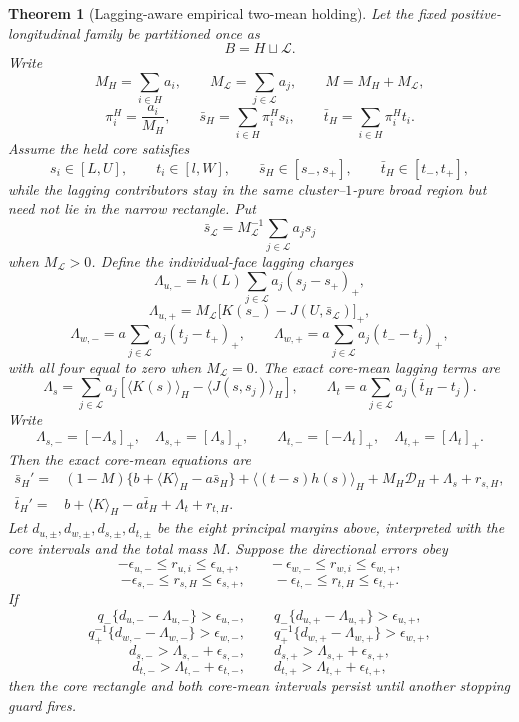\documentclass{article} %
\theoremstyle{plain}
\newtheorem{theorem}{Theorem}[section]
\theoremstyle{definition}
\theoremstyle{remark}
\begin{document}
\begin{theorem}[Lagging-aware empirical two-mean holding]
\label{sbemp:lagging-holding}
Let the fixed positive-longitudinal family be partitioned once as
\[
 B=H\sqcup\mathcal L.
\]
Write
\[
 M_H=\sum_{i\in H}a_i,\qquad
 M_{\mathcal L}=\sum_{j\in\mathcal L}a_j,\qquad M=M_H+M_{\mathcal L},
\]
\[
 \pi_i^H=\frac{a_i}{M_H},\qquad
 \bar s_H=\sum_{i\in H}\pi_i^Hs_i,\qquad
 \bar t_H=\sum_{i\in H}\pi_i^Ht_i.
\]
Assume the held core satisfies
\[
 s_i\in[L,U],\qquad t_i\in[l,W],\qquad
 \bar s_H\in[s_-,s_+],\qquad \bar t_H\in[t_-,t_+],
\]
while the lagging contributors stay in the same cluster--$1$-pure broad
region but need not lie in the narrow rectangle.  Put
\[
 \bar s_{\mathcal L}
 =M_{\mathcal L}^{-1}\sum_{j\in\mathcal L}a_js_j
\]
when $M_{\mathcal L}>0$.  Define the individual-face lagging charges
\[
 \Lambda_{u,-}
 =h(L)\sum_{j\in\mathcal L}a_j(s_j-s_+)_+,
\]
\[
 \Lambda_{u,+}
 =M_{\mathcal L}
 \bigl[K(s_-)-J(U,\bar s_{\mathcal L})\bigr]_+,
\]
\[
 \Lambda_{w,-}
 =a\sum_{j\in\mathcal L}a_j(t_j-t_+)_+,
 \qquad
 \Lambda_{w,+}
 =a\sum_{j\in\mathcal L}a_j(t_--t_j)_+,
\]
with all four equal to zero when $M_{\mathcal L}=0$.  The exact core-mean
lagging terms are
\[
 \Lambda_s
 =\sum_{j\in\mathcal L}a_j
 \left[\langle K(s)\rangle_H
       -\langle J(s,s_j)\rangle_H\right],
 \qquad
 \Lambda_t
 =a\sum_{j\in\mathcal L}a_j(\bar t_H-t_j).
\]
Write
\[
 \Lambda_{s,-}=[-\Lambda_s]_+,
 \quad \Lambda_{s,+}=[\Lambda_s]_+,
 \qquad
 \Lambda_{t,-}=[-\Lambda_t]_+,
 \quad \Lambda_{t,+}=[\Lambda_t]_+.
\]
Then the exact core-mean equations are
\begin{align}
 \bar s_H'={}&(1-M)\{b+\langle K\rangle_H-a\bar s_H\}
 +\langle(t-s)h(s)\rangle_H+M_H\mathcal D_H
 +\Lambda_s+r_{s,H},\label{sbemp:lagging-mean-s}\\
 \bar t_H'={}&b+\langle K\rangle_H-a\bar t_H
 +\Lambda_t+r_{t,H}.\label{sbemp:lagging-mean-t}
\end{align}
Let $d_{u,\pm},d_{w,\pm},d_{s,\pm},d_{t,\pm}$ be the eight principal
margins above, interpreted with the core intervals and the total mass $M$.
Suppose the directional errors obey
\[
 -\epsilon_{u,-}\le r_{u,i}\le\epsilon_{u,+},\qquad
 -\epsilon_{w,-}\le r_{w,i}\le\epsilon_{w,+},
\]
\[
 -\epsilon_{s,-}\le r_{s,H}\le\epsilon_{s,+},\qquad
 -\epsilon_{t,-}\le r_{t,H}\le\epsilon_{t,+}.
\]
If
\[
 q_-\{d_{u,-}-\Lambda_{u,-}\}>\epsilon_{u,-},\qquad
 q_-\{d_{u,+}-\Lambda_{u,+}\}>\epsilon_{u,+},
\]
\[
 q_+^{-1}\{d_{w,-}-\Lambda_{w,-}\}>\epsilon_{w,-},\qquad
 q_+^{-1}\{d_{w,+}-\Lambda_{w,+}\}>\epsilon_{w,+},
\]
\[
 d_{s,-}>\Lambda_{s,-}+\epsilon_{s,-},\qquad
 d_{s,+}>\Lambda_{s,+}+\epsilon_{s,+},
\]
\[
 d_{t,-}>\Lambda_{t,-}+\epsilon_{t,-},\qquad
 d_{t,+}>\Lambda_{t,+}+\epsilon_{t,+},
\]
then the core rectangle and both core-mean intervals persist until another
stopping guard fires.
\end{theorem}
\end{document}

